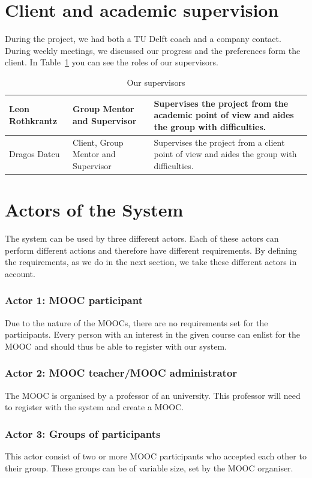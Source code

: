 \section{Client and academic supervision}
During the project, we had both a TU Delft coach and a company contact.
During weekly meetings, we discussed our progress and the preferences form the client.
In Table~\ref{supervision} you can see the roles of our supervisors.

\begin{table}[h]
\begin{tabular}{ | p{3cm} | p{5cm} | p{6cm} | }
 \hline
Leon Rothkrantz & Group Mentor and Supervisor & Supervises the project from the academic point of view and aides the group with difficulties.\\ \hline
Dragos Datcu &  Client, Group Mentor and Supervisor & Supervises the project from a client point of view and aides the group with difficulties.\\
\hline
\end{tabular}
\caption{Our supervisors}
\label{supervision}
\end{table}

\section{Actors of the System}
The system can be used by three different actors.
Each of these actors can perform different actions and therefore have different requirements.
By defining the requirements, as we do in the next section, we take these different actors in account.

\subsubsection{Actor 1: MOOC participant}
Due to the nature of the MOOCs, there are no requirements set for the participants.
Every person with an interest in the given course can enlist for the MOOC and should thus be able to register with our system.
\subsubsection{Actor 2: MOOC teacher/MOOC administrator} 
The MOOC is organised by a professor of an university.
This professor will need to register with the system and create a MOOC.
\subsubsection{Actor 3: Groups of participants}
This actor consist of two or more MOOC participants who accepted each other to their group.
These groups can be of variable size, set by the MOOC organiser.

